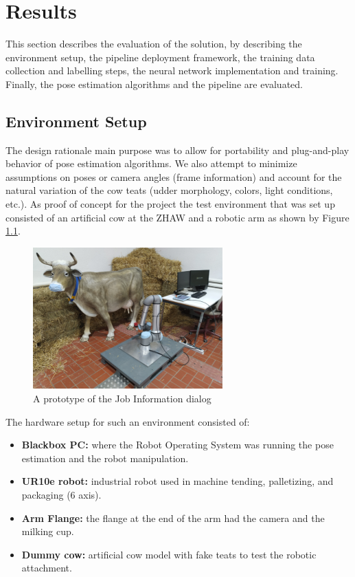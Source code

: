 
\chapter{Results}\label{chap:evaluation}
\lipsum[1]

This section describes the evaluation of the solution, by describing the environment setup, the pipeline deployment framework, the training data collection and labelling steps, the neural network implementation and training. Finally, the pose estimation algorithms and the pipeline are evaluated.

\section{Environment Setup}
    The design rationale main purpose was to allow for portability and plug-and-play behavior of pose estimation algorithms. We also attempt to minimize assumptions on poses or camera angles (frame information) and account for the natural variation of the cow teats (udder morphology, colors, light conditions, etc.). As proof of concept for the project the test environment that was set up consisted of an artificial cow at the ZHAW and a robotic arm as shown by Figure \ref{fig:cow_setup}.
    
    \begin{figure}[h]
        \centering
        \includegraphics[width=0.65\textwidth]{images/cow_setup.png}
        \caption{A prototype of the Job Information dialog}
        \label{fig:cow_setup}
    \end{figure}
    The hardware setup for such an environment consisted of:
    \begin{itemize}
        \item \textbf{Blackbox PC:} where the Robot Operating System was running the pose estimation and the robot manipulation.
        \item \textbf{UR10e robot:} industrial robot used in machine tending, palletizing, and packaging (6 axis).
        \item \textbf{Arm Flange:} the flange at the end of the arm had the camera and the milking cup.
        \item \textbf{Dummy cow:} artificial cow model with fake teats to test the robotic attachment.
    \end{itemize}
   
